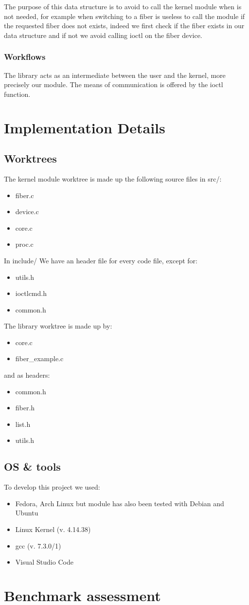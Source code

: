 \documentclass[a4paper,10pt]{article}
\begin{document}
The purpose of this data structure is to avoid to call the kernel module when is not needed, for example when switching to a fiber is useless to call the module if the requested fiber does not exists, indeed we first check if the fiber exists in our data structure and if not we avoid calling ioctl on the fiber device.

\subsubsection{Workflows}
The library acts as an intermediate between the user and the kernel, more precisely our module. The means of communication is offered by the ioctl function.

\section{Implementation Details}
\subsection{Worktrees}
The kernel module worktree is made up the following source files in src/:
\begin{itemize}
	\item fiber.c
	\item device.c
	\item core.c
	\item proc.c
\end{itemize}
In include/ We have an header file for every code file, except for:
\begin{itemize}
	\item utils.h
	\item ioctlcmd.h
	\item common.h
\end{itemize}


The library worktree is made up by:
\begin{itemize}
	\item core.c
	\item fiber\_example.c
\end{itemize}
and as headers:
\begin{itemize}
	\item common.h
	\item fiber.h
	\item list.h
	\item utils.h
\end{itemize}


\subsection{OS \& tools}
To develop this project we used:
\begin{itemize}
\item Fedora, Arch Linux but module has also been tested with Debian and Ubuntu
\item Linux Kernel (v. 4.14.38)
\item gcc (v. 7.3.0/1)
\item Visual Studio Code
\end{itemize}

\section{Benchmark assessment}
\end{document}
